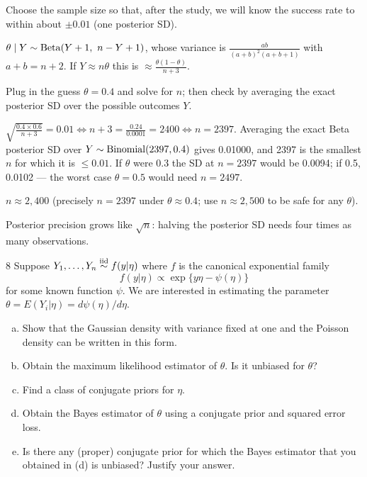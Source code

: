 \documentclass[11pt]{article}
\begin{document}
\begin{restate}
Choose the sample size so that, after the study, we will know the success rate to within about $\pm0.01$ (one posterior SD).
\end{restate}

\begin{recall}
$\theta\mid Y\sim\dist{Beta}(Y+1,\ n-Y+1)$, whose variance is $\frac{ab}{(a+b)^2(a+b+1)}$ with $a+b=n+2$. If $Y\approx n\theta$ this is $\approx\frac{\theta(1-\theta)}{n+3}$.
\end{recall}

\begin{keyidea}
Plug in the guess $\theta=0.4$ and solve for $n$; then check by averaging the exact posterior SD over the possible outcomes $Y$.
\end{keyidea}

\solution
{} $\sqrt{\frac{0.4\times0.6}{n+3}}=0.01\iff n+3=\frac{0.24}{0.0001}=2400\iff n=2397$.
 Averaging the exact Beta posterior SD over $Y\sim\mathrm{Binomial}(2397,0.4)$ gives 0.01000, and 2397 is the smallest $n$ for which it is $\le0.01$.
 If $\theta$ were 0.3 the SD at $n=2397$ would be 0.0094; if 0.5, 0.0102 --- the worst case $\theta=0.5$ would need $n=2497$.

\begin{answer}
$n\approx2{,}400$ (precisely $n=2397$ under $\theta\approx0.4$; use $n\approx2{,}500$ to be safe for any $\theta$).
\end{answer}

\begin{takeaway}
Posterior precision grows like $\sqrt n$: halving the posterior SD needs four times as many observations.
\end{takeaway}


\begin{problem}{8}
Suppose $Y_1,\dots,Y_n\stackrel{\text{iid}}{\sim} f(y|\eta)$ where $f$ is the canonical exponential family
\[
f(y|\eta)\propto\exp\{y\eta-\psi(\eta)\}
\]
for some known function $\psi$. We are interested in estimating the parameter $\theta=E(Y_i|\eta)=d\psi(\eta)/d\eta$.
\begin{enumerate}[(a)]
\item Show that the Gaussian density with variance fixed at one and the Poisson density can be written in this form.
\item Obtain the maximum likelihood estimator of $\theta$. Is it unbiased for $\theta$?
\item Find a class of conjugate priors for $\eta$.
\item Obtain the Bayes estimator of $\theta$ using a conjugate prior and squared error loss.
\item Is there any (proper) conjugate prior for which the Bayes estimator that you obtained in (d) is unbiased? Justify your answer.
\end{enumerate}
\end{problem}
\end{document}
